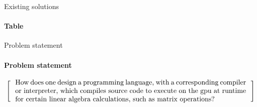
\begin{frame}{Existing solutions}
\framesubtitle{Table }
   
\end{frame}

\begin{frame}{Problem statement}
\framesubtitle{Problem statement}
\[
  \left[
  \begin{minipage}{\textwidth}
  \centering
  \begin{minipage}{0.96\textwidth}
  How does one design a programming language, with a corresponding compiler or interpreter, which compiles source code to execute on the gpu at runtime for certain linear algebra calculations, such as matrix operations?
  \end{minipage}
  \end{minipage}
    \right]
\]
\end{frame}